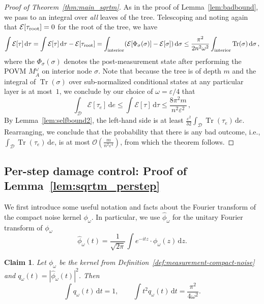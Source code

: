 \documentclass[10pt]{article}
\renewcommand{\epsilon}{\varepsilon}
\newcommand{\energy}{\mathcal{E}}
\newcommand{\luders}{\Phi}
\DeclareMathOperator{\Tr}{Tr}
\newtheorem{claim}[theorem]{Claim}
\newcommand{\angelos}[1]{{\color{blue}[angelos: #1]}}
\renewcommand{\angelos}[1]{}
\newcommand{\lift}[1]{\overline{#1}}
\begin{document}
\begin{proof}[Proof of Theorem~\ref{thm:main_sqrtm}]
    As in the proof of Lemma~\ref{lem:badbound}, we pass to an integral over \emph{all} leaves of the tree. Telescoping and noting again that $\energy[\tau_{\rm root}] = 0$ for the root of the tree, we have
    \begin{equation}
        \int \energy[\tau]\,\mathrm{d}\tau = \int \energy[\tau]\,\mathrm{d}\tau- \energy[\tau_{\rm root}] = \int_{\rm interior} (\energy[\luders_\sigma(\sigma)] - \energy[\sigma])\,\mathrm{d}\sigma \le \frac{\pi^2}{2n^2\omega^2}\int_{\rm interior} \Tr(\sigma)\,\mathrm{d}\sigma\,,
    \end{equation}
    where the $\luders_\sigma(\sigma)$ denotes the post-measurement state after performing the POVM $M^\omega_{\lift{A}}$ on interior node $\sigma$.
    Note that because the tree is of depth $m$ and the integral of $\Tr(\sigma)$ over sub-normalized conditional states at any particular layer is at most~$1$, we conclude by our choice of $\omega = \epsilon/4$ that
    \begin{equation}
        \int_{\mathcal{D}}\energy[\tau_e]\,\mathrm{d}e \le \int \energy[\tau]\,\mathrm{d}\tau \le \frac{8\pi^2 m}{n^2\epsilon^2}\,, \label{eq:charge2}
    \end{equation}
    By Lemma~\ref{lem:selfbound2}, the left-hand side is at least $\frac{\epsilon^2}{32}\int_{\mathcal{D}} \Tr(\tau_e)\,\mathrm{d}e$.
    Rearranging, we conclude that the probability that there is any bad outcome, i.e., $\int_{\mathcal{D}} \Tr(\tau_e)\,\mathrm{d}e$, is at most $\mathcal{O}(\frac{m}{n^2\epsilon^4})$, from which the theorem follows.
\end{proof}


\subsection{Per-step damage control: Proof of Lemma~\ref{lem:sqrtm_perstep}}
\label{sec:sqrtm_perstep_proof}

We first introduce some useful notation and facts about the Fourier transform of the compact noise kernel $\phi_{\omega}$. In particular, we use $\widehat{\phi}_\omega$ for the unitary Fourier transform of $\phi_\omega$
\begin{equation*}
    \widehat{\phi}_\omega(t) = \frac{1}{\sqrt{2\pi}} \int e^{-itz} \cdot \phi_{\omega}(z)\,\mathrm{d}z.
\end{equation*}
\begin{claim}
    \label{cl:compact-kernel-fourier-facts}
   Let $\phi_{\omega}$ be the kernel from Definition~\ref{def:measurement-compact-noise} and $q_\omega(t) = |\widehat{\phi}_\omega(t)|^2$. Then
   \begin{equation*}
        \int q_\omega(t)\,\mathrm{d}t = 1,
        \qquad
        \int t^2 q_\omega(t)\,\mathrm{d}t = \frac{\pi^2}{4\omega^2}.
   \end{equation*}
\end{claim}
\end{document}
